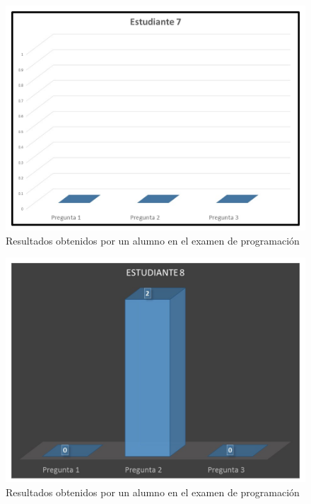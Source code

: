 \documentclass[12pt] {report}
\begin{document}
\begin{figure}[H]
\centering 
\includegraphics[scale=.7]{PEstudiante7.JPG}
\caption{Resultados obtenidos por un alumno en el examen de programación}
\end{figure}

\begin{figure}[H]
\centering 
\includegraphics[scale=.7]{PEstudiante8.JPG}
\caption{Resultados obtenidos por un alumno en el examen de programación}
\end{figure}
\end{document}

